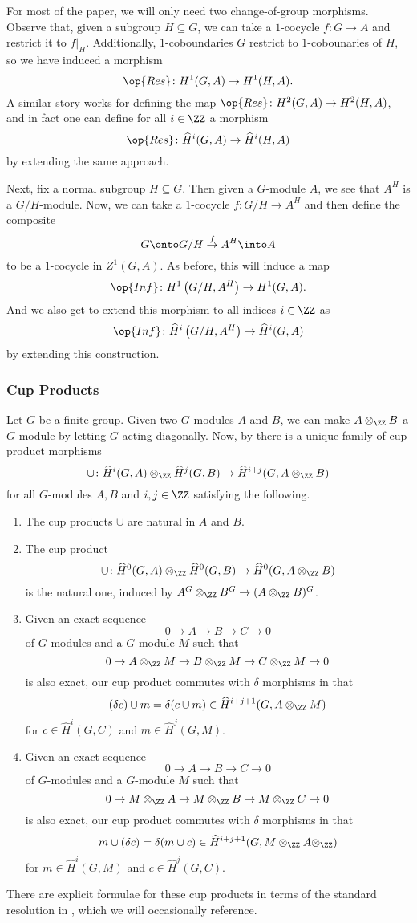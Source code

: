 For most of the paper, we will only need two change-of-group morphisms. Observe that, given a subgroup $H\subseteq G$, we can take a $1$-cocycle $f\colon G\to A$ and restrict it to $f|_H$. Additionally, $1$-coboundaries $G$ restrict to $1$-cobounaries of $H$, so we have induced a morphism
\[\op{Res}\colon H^1(G,A)\to H^1(H,A).\]
A similar story works for defining the map $\op{Res}\colon H^2(G,A)\to H^2(H,A)$, and in fact one can define for all $i\in\ZZ$ a morphism
\[\op{Res}\colon\widehat H^i(G,A)\to\widehat H^i(H,A)\]
by extending the same approach.

Next, fix a normal subgroup $H\subseteq G$. Then given a $G$-module $A$, we see that $A^H$ is a $G/H$-module. Now, we can take a $1$-cocycle $f\colon G/H\to A^H$ and then define the composite
\[G\onto G/H\stackrel f\to A^H\into A\]
to be a $1$-cocycle in $Z^1(G,A)$. As before, this will induce a map
\[\op{Inf}\colon H^1\left(G/H,A^H\right)\to H^1(G,A).\]
And we also get to extend this morphism to all indices $i\in\ZZ$ as
\[\op{Inf}\colon\widehat H^i\left(G/H,A^H\right)\to\widehat H^i(G,A)\]
by extending this construction.

\subsubsection{Cup Products}
Let $G$ be a finite group. Given two $G$-modules $A$ and $B$, we can make $A\otimes_\ZZ B$ a $G$-module by letting $G$ acting diagonally. Now, by \cite[Theorem~4]{atiyah-wall} there is a unique family of cup-product morphisms
\[\cup\colon\widehat H^i(G,A)\otimes_\ZZ\widehat H^j(G,B)\to\widehat H^{i+j}(G,A\otimes_\ZZ B)\]
for all $G$-modules $A,B$ and $i,j\in\ZZ$ satisfying the following.
\begin{enumerate}
	\item The cup products $\cup$ are natural in $A$ and $B$.
	\item The cup product
	\[\cup\colon\widehat H^0(G,A)\otimes_\ZZ\widehat H^0(G,B)\to\widehat H^0(G,A\otimes_\ZZ B)\]
	is the natural one, induced by $A^G\otimes_\ZZ B^G\to(A\otimes_\ZZ B)^G$.
	\item Given an exact sequence
	\[0\to A\to B\to C\to 0\]
	of $G$-modules and a $G$-module $M$ such that
	\[0\to A\otimes_\ZZ M\to B\otimes_\ZZ M\to C\otimes_\ZZ M\to 0\]
	is also exact, our cup product commutes with $\delta$ morphisms in that
	\[(\delta c)\cup m=\delta(c\cup m)\in\widehat H^{i+j+1}(G,A\otimes_\ZZ M)\]
	for $c\in\widehat H^i(G,C)$ and $m\in\widehat H^j(G,M)$.
	\item Given an exact sequence
	\[0\to A\to B\to C\to 0\]
	of $G$-modules and a $G$-module $M$ such that
	\[0\to M\otimes_\ZZ A\to M\otimes_\ZZ B\to M\otimes_\ZZ C\to 0\]
	is also exact, our cup product commutes with $\delta$ morphisms in that
	\[m\cup(\delta c)=\delta(m\cup c)\in\widehat H^{i+j+1}(G,M\otimes_\ZZ A\otimes_\ZZ)\]
	for $m\in\widehat H^i(G,M)$ and $c\in\widehat H^j(G,C)$.
\end{enumerate}
There are explicit formulae for these cup products in terms of the standard resolution in \cite[p.~107]{atiyah-wall}, which we will occasionally reference.

